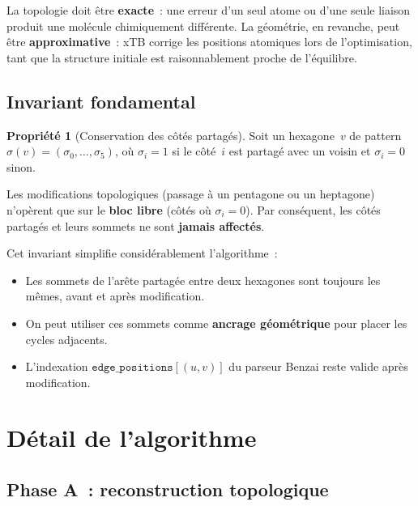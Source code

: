 \documentclass[12pt,a4paper]{article}
\theoremstyle{definition}
\newtheorem{propriete}{Propri\'et\'e}[section]
\theoremstyle{remark}
\begin{document}
La topologie doit \^etre \textbf{exacte}~: une erreur d'un seul atome
ou d'une seule liaison produit une mol\'ecule chimiquement diff\'erente.
La g\'eom\'etrie, en revanche, peut \^etre \textbf{approximative}~: xTB
corrige les positions atomiques lors de l'optimisation, tant que la
structure initiale est raisonnablement proche de l'\'equilibre.

\subsection{Invariant fondamental}

\begin{propriete}[Conservation des c\^ot\'es partag\'es]
\label{prop:invariant}
Soit un hexagone~$v$ de pattern $\sigma(v) = (\sigma_0, \ldots, \sigma_5)$,
o\`u $\sigma_i = 1$ si le c\^ot\'e~$i$ est partag\'e avec un voisin et
$\sigma_i = 0$ sinon.

Les modifications topologiques (passage \`a un pentagone ou un heptagone)
n'op\`erent que sur le \textbf{bloc libre} (c\^ot\'es o\`u $\sigma_i = 0$).
Par cons\'equent, les c\^ot\'es partag\'es et leurs sommets ne sont
\textbf{jamais affect\'es}.
\end{propriete}

Cet invariant simplifie consid\'erablement l'algorithme~:
\begin{itemize}[nosep]
  \item Les sommets de l'ar\^ete partag\'ee entre deux hexagones sont
        toujours les m\^emes, avant et apr\`es modification.
  \item On peut utiliser ces sommets comme \textbf{ancrage g\'eom\'etrique}
        pour placer les cycles adjacents.
  \item L'indexation $\texttt{edge\_positions}[(u,v)]$ du parseur Benzai
        reste valide apr\`es modification.
\end{itemize}


\section{D\'etail de l'algorithme}

\subsection{Phase A~: reconstruction topologique}
\end{document}

